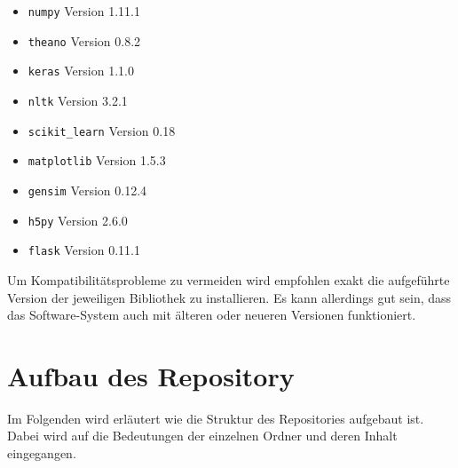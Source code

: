 \begin{itemize}[noitemsep]
  \item \texttt{numpy} Version 1.11.1
  \item \texttt{theano} Version 0.8.2
  \item \texttt{keras} Version 1.1.0
  \item \texttt{nltk} Version 3.2.1
  \item \texttt{scikit{\_}learn} Version 0.18
  \item \texttt{matplotlib} Version 1.5.3
  \item \texttt{gensim} Version 0.12.4
  \item \texttt{h5py} Version 2.6.0
  \item \texttt{flask} Version 0.11.1
\end{itemize}

Um Kompatibilitätsprobleme zu vermeiden wird empfohlen exakt die aufgeführte Version der jeweiligen Bibliothek zu installieren. Es kann allerdings gut sein, dass das Software-System auch mit älteren oder neueren Versionen funktioniert.

\section{Aufbau des Repository}
Im Folgenden wird erläutert wie die Struktur des Repositories aufgebaut ist. Dabei wird auf die Bedeutungen der einzelnen Ordner und deren Inhalt eingegangen.


